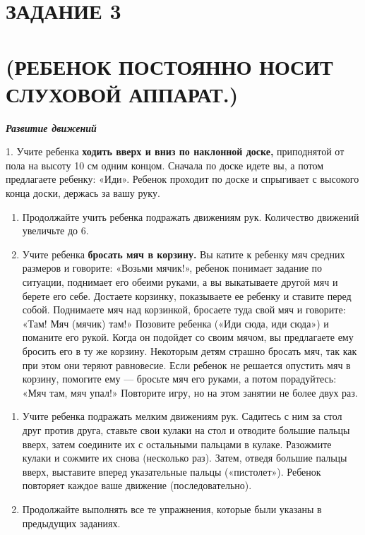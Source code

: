 \documentclass[a5paper]{book}
\renewcommand{\emph}[1]{\textit{#1}}
\begin{document}
\section{ЗАДАНИЕ 3}\section*{(РЕБЕНОК ПОСТОЯННО НОСИТ СЛУХОВОЙ АППАРАТ.)}

\textbf{\emph{Развитие движений}}

1. Учите ребенка \textbf{ходить вверх и вниз по наклонной доске,}
приподнятой от пола на высоту 10 см одним концом. Сначала по доске идете
вы, а потом предлагаете ребенку: «Иди». Ребенок проходит по доске и
спрыгивает с высокого конца доски, держась за вашу руку.


\begin{enumerate}
\def\labelenumi{\arabic{enumi}.}
\setcounter{enumi}{1}
\item
  
  Продолжайте учить ребенка подражать движениям рук. Количество движений
  увеличьте до 6.
  
\item
  
  Учите ребенка \textbf{бросать мяч в корзину.} Вы катите к ребенку мяч
  средних размеров и говорите: «Возьми мячик!», ребенок понимает задание
  по ситуации, поднимает его обеими руками, а вы выкатываете другой мяч
  и берете его себе. Достаете корзинку, показываете ее ребенку и ставите
  перед собой. Поднимаете мяч над корзинкой, бросаете туда свой мяч и
  говорите: «Там! Мяч (мячик) там!» Позовите ребенка («Иди сюда, иди
  сюда») и поманите его рукой. Когда он подойдет со своим мячом, вы
  предлагаете ему бросить его в ту же корзину. Некоторым детям страшно
  бросать мяч, так как при этом они теряют равновесие. Если ребенок не
  решается опустить мяч в корзину, помогите ему --- бросьте мяч его
  руками, а потом порадуйтесь: «Мяч там, мяч упал!» Повторите игру, но
  на этом занятии не более двух раз.
  
\end{enumerate}

\begin{enumerate}
\def\labelenumi{\arabic{enumi}.}
\setcounter{enumi}{3}
\item
  
  Учите ребенка подражать мелким движениям рук. Садитесь с ним за стол
  друг против друга, ставьте свои кулаки на стол и отводите большие
  пальцы вверх, затем соедините их с остальными пальцами в кулаке.
  Разожмите кулаки и сожмите их снова (несколько раз). Затем, отведя
  большие пальцы вверх, выставите вперед указательные пальцы
  («пистолет»). Ребенок повторяет каждое ваше движение
  (последовательно).
  
\item
  
  Продолжайте выполнять все те упражнения, которые были указаны в
  предыдущих заданиях.
  
\end{enumerate}
\end{document}
